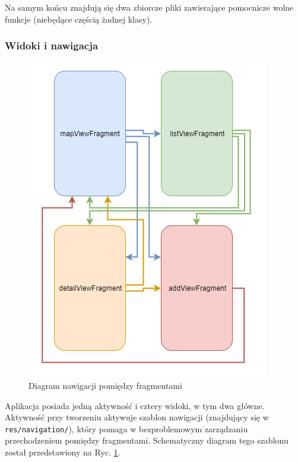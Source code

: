 \documentclass[polish,polish,a4paper,12pt]{article}
\begin{document}
		Na samym końcu znajdują się dwa zbiorcze pliki zawierające pomocnicze wolne funkcje (niebędące częścią żadnej klasy).


		\subsubsection{Widoki i nawigacja}

		\begin{figure}[H]
			\centering
			\includegraphics[width = \textwidth]{navigation}
			\caption{Diagram nawigacji pomiędzy fragmentami}
			\label{fig:navigation}
		\end{figure}

		Aplikacja posiada jedną aktywność i cztery widoki, w tym dwa główne. Aktywność przy tworzeniu aktywuje szablon nawigacji (znajdujący się w \texttt{res/navigation/}), który pomaga w bezproblemowym zarządzaniu przechodzeniem pomiędzy fragmentami. Schematyczny diagram tego szablonu został przedstawiony na Ryc. \ref{fig:navigation}.
\end{document}
